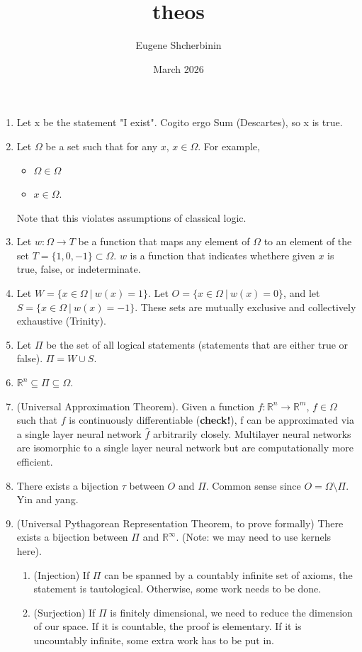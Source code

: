 \documentclass{article}
\title{theos}
\author{Eugene Shcherbinin}
\date{March 2026}
\begin{document}
\maketitle

\begin{enumerate}
    \item Let x be the statement "I exist". Cogito ergo Sum (Descartes), so x is true.
    \item Let $\Omega$ be a set such that for any $x$, $x \in \Omega$. For example, 
    \begin{itemize}
        \item $\Omega \in \Omega$
        \item $x \in \Omega$.
    \end{itemize}
    Note that this violates assumptions of classical logic.
    
    \item Let $w: \Omega \to T $ be a function that maps any element of $\Omega$ to an element of the set $ T =  \{1, 0, -1\} \subset\Omega$. $w$ is a function that indicates whethere  given $x$ is true, false, or indeterminate.

    \item Let $W = \{x \in \Omega \ | \  w(x) = 1\}$. Let $O = \{x \in \Omega \ | \  w(x) = 0\}$, and let $S = \{x \in \Omega \ | \  w(x) = -1\}$. These sets are mutually exclusive and collectively exhaustive (Trinity).

    \item Let $\Pi$ be the set of all logical statements (statements that are either true or false). $\Pi = W \cup S$.

    \item $\mathbb{R}^n \subseteq \Pi \subseteq \Omega$.

    \item (Universal Approximation Theorem). Given a function $f: \mathbb R ^ n \to \mathbb R ^ m$, $f \in \Omega$ such that $f$ is continuously differentiable (\textbf{check!}), f can be approximated via a single layer neural network $\hat f$ arbitrarily closely. Multilayer neural networks are isomorphic to a single layer neural network but are computationally more efficient.

    \item There exists a bijection $\tau$ between $O$ and $\Pi$. Common sense since $O = \Omega \setminus \Pi$. Yin and yang.
    
    \item (Universal Pythagorean Representation Theorem, to prove formally) There exists a bijection between $\Pi$ and $\mathbb R^\infty$. (Note: we may need to use kernels here).
        \begin{enumerate}
          \item (Injection) If $\Pi$ can be spanned by a countably infinite set of axioms, the statement is tautological. Otherwise, some work needs to be done.
          \item (Surjection) If $\Pi$ is finitely dimensional, we need to reduce the dimension of our space. If it is countable, the proof is elementary. If it is uncountably infinite, some extra work has to be put in.
        \end{enumerate}


\end{enumerate}
\end{document}
